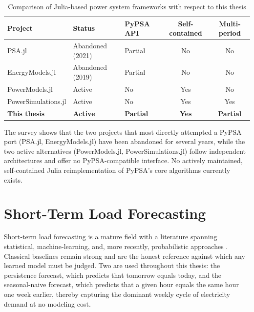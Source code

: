 \begin{table}[h]
\centering
\caption{Comparison of Julia-based power system frameworks with respect to this thesis}
\label{tab:related_work}
\begin{tabular}{l l l c c}
\toprule
\textbf{Project} & \textbf{Status} & \textbf{PyPSA API} & \textbf{Self-contained} & \textbf{Multi-period} \\
\midrule
PSA.jl              & Abandoned (2021) & Partial & No  & No  \\
EnergyModels.jl     & Abandoned (2019) & Partial & No  & No  \\
PowerModels.jl      & Active           & No      & Yes & No  \\
PowerSimulations.jl & Active           & No      & Yes & Yes \\
\textbf{This thesis}  & \textbf{Active}  & \textbf{Partial} & \textbf{Yes} & \textbf{Partial} \\
\bottomrule
\end{tabular}
\end{table}

The survey shows that the two projects that most directly attempted a PyPSA port (PSA.jl, EnergyModels.jl) have been abandoned for several years, while the two active alternatives (PowerModels.jl, PowerSimulations.jl) follow independent architectures and offer no PyPSA-compatible interface. No actively maintained, self-contained Julia reimplementation of PyPSA's core algorithms currently exists.

\section{Short-Term Load Forecasting}

Short-term load forecasting is a mature field with a literature spanning statistical, machine-learning, and, more recently, probabilistic approaches \cite{hong2016probabilistic}. Classical baselines remain strong and are the honest reference against which any learned model must be judged. Two are used throughout this thesis: the persistence forecast, which predicts that tomorrow equals today, and the seasonal-naive forecast, which predicts that a given hour equals the same hour one week earlier, thereby capturing the dominant weekly cycle of electricity demand at no modeling cost.

